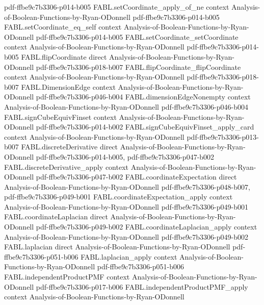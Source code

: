 \begin{theorem}
  {pdf-ffbe9c7b3306-p014-b005}
\proofstep
  {FABL.setCoordinate_apply_of_ne}
  {context}
  {Analysis-of-Boolean-Functions-by-Ryan-ODonnell}
  {pdf-ffbe9c7b3306-p014-b005}
\proofstep
  {FABL.setCoordinate_eq_self}
  {context}
  {Analysis-of-Boolean-Functions-by-Ryan-ODonnell}
  {pdf-ffbe9c7b3306-p014-b005}
\proofstep
  {FABL.setCoordinate_setCoordinate}
  {context}
  {Analysis-of-Boolean-Functions-by-Ryan-ODonnell}
  {pdf-ffbe9c7b3306-p014-b005}
\proofstep
  {FABL.flipCoordinate}
  {direct}
  {Analysis-of-Boolean-Functions-by-Ryan-ODonnell}
  {pdf-ffbe9c7b3306-p018-b007}
\proofstep
  {FABL.flipCoordinate_flipCoordinate}
  {context}
  {Analysis-of-Boolean-Functions-by-Ryan-ODonnell}
  {pdf-ffbe9c7b3306-p018-b007}
\proofstep
  {FABL.DimensionEdge}
  {context}
  {Analysis-of-Boolean-Functions-by-Ryan-ODonnell}
  {pdf-ffbe9c7b3306-p046-b004}
\proofstep
  {FABL.dimensionEdgeNonempty}
  {context}
  {Analysis-of-Boolean-Functions-by-Ryan-ODonnell}
  {pdf-ffbe9c7b3306-p046-b004}
\proofstep
  {FABL.signCubeEquivFinset}
  {context}
  {Analysis-of-Boolean-Functions-by-Ryan-ODonnell}
  {pdf-ffbe9c7b3306-p014-b002}
\proofstep
  {FABL.signCubeEquivFinset_apply_card}
  {context}
  {Analysis-of-Boolean-Functions-by-Ryan-ODonnell}
  {pdf-ffbe9c7b3306-p013-b007}
\proofstep
  {FABL.discreteDerivative}
  {direct}
  {Analysis-of-Boolean-Functions-by-Ryan-ODonnell}
  {pdf-ffbe9c7b3306-p014-b005,
    pdf-ffbe9c7b3306-p047-b002}
\proofstep
  {FABL.discreteDerivative_apply}
  {context}
  {Analysis-of-Boolean-Functions-by-Ryan-ODonnell}
  {pdf-ffbe9c7b3306-p047-b002}
\proofstep
  {FABL.coordinateExpectation}
  {direct}
  {Analysis-of-Boolean-Functions-by-Ryan-ODonnell}
  {pdf-ffbe9c7b3306-p048-b007,
    pdf-ffbe9c7b3306-p049-b001}
\proofstep
  {FABL.coordinateExpectation_apply}
  {context}
  {Analysis-of-Boolean-Functions-by-Ryan-ODonnell}
  {pdf-ffbe9c7b3306-p049-b001}
\proofstep
  {FABL.coordinateLaplacian}
  {direct}
  {Analysis-of-Boolean-Functions-by-Ryan-ODonnell}
  {pdf-ffbe9c7b3306-p049-b002}
\proofstep
  {FABL.coordinateLaplacian_apply}
  {context}
  {Analysis-of-Boolean-Functions-by-Ryan-ODonnell}
  {pdf-ffbe9c7b3306-p049-b002}
\proofstep
  {FABL.laplacian}
  {direct}
  {Analysis-of-Boolean-Functions-by-Ryan-ODonnell}
  {pdf-ffbe9c7b3306-p051-b006}
\proofstep
  {FABL.laplacian_apply}
  {context}
  {Analysis-of-Boolean-Functions-by-Ryan-ODonnell}
  {pdf-ffbe9c7b3306-p051-b006}
\proofstep
  {FABL.independentProductPMF}
  {context}
  {Analysis-of-Boolean-Functions-by-Ryan-ODonnell}
  {pdf-ffbe9c7b3306-p017-b006}
\proofstep
  {FABL.independentProductPMF_apply}
  {context}
  {Analysis-of-Boolean-Functions-by-Ryan-ODonnell}

\end{theorem}
